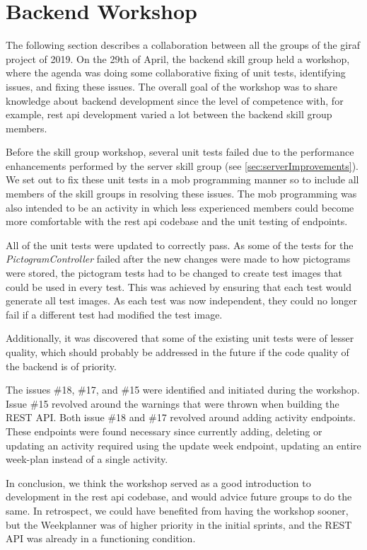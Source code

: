 \section{Backend Workshop}
The following section describes a collaboration between all the groups of the \gls{giraf} project of 2019. On the 29th of April, the backend skill group held a workshop, where the agenda was doing some collaborative fixing of unit tests, identifying issues, and fixing these issues. The overall goal of the workshop was to share knowledge about backend development since the level of competence with, for example, \gls{rest} \gls{api} development varied a lot between the backend skill group members.

Before the skill group workshop, several unit tests failed due to the performance enhancements performed by the server skill group (see \autoref{sec:serverImprovements}). We set out to fix these unit tests in a mob programming manner so to include all members of the skill groups in resolving these issues. The mob programming was also intended to be an activity in which less experienced members could become more comfortable with the \gls{rest} \gls{api} codebase and the unit testing of endpoints.

All of the unit tests were updated to correctly pass. As some of the tests for the \textit{PictogramController} failed after the new changes were made to how pictograms were stored, the pictogram tests had to be changed to create test images that could be used in every test. This was achieved by ensuring that each test would generate all test images. As each test was now independent, they could no longer fail if a different test had modified the test image.

Additionally, it was discovered that some of the existing unit tests were of lesser quality, which should probably be addressed in the future if the code quality of the backend is of priority.

The issues \#18, \#17, and \#15 were identified and initiated during the workshop. Issue \#15 revolved around the warnings that were thrown when building the REST API. Both issue \#18 and \#17 revolved around adding activity endpoints. These endpoints were found necessary since currently adding, deleting or updating an activity required using the update week endpoint, updating an entire week-plan instead of a single activity.

In conclusion, we think the workshop served as a good introduction to development in the  \gls{rest} \gls{api} codebase, and would advice future groups to do the same. In retrospect, we could have benefited from having the workshop sooner, but the Weekplanner was of higher priority in the initial sprints, and the REST API was already in a functioning condition.